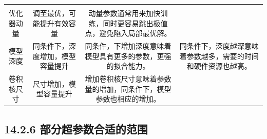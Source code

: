 \begin{longtable}[]{@{}cccc@{}}
\begin{minipage}[t]{0.31\columnwidth}
\end{minipage}\tabularnewline
\begin{minipage}[t]{0.10\columnwidth}\centering\strut
优化器动量\strut
\end{minipage} & \begin{minipage}[t]{0.17\columnwidth}\centering\strut
调至最优，可能提升有效容量\strut
\end{minipage} & \begin{minipage}[t]{0.31\columnwidth}\centering\strut
动量参数通常用来加快训练，同时更容易跳出极值点，避免陷入局部最优解。\strut
\end{minipage} & \begin{minipage}[t]{0.31\columnwidth}\centering\strut
\strut
\end{minipage}\tabularnewline
\begin{minipage}[t]{0.10\columnwidth}\centering\strut
模型深度\strut
\end{minipage} & \begin{minipage}[t]{0.17\columnwidth}\centering\strut
同条件下，深度增加，模型容量提升\strut
\end{minipage} & \begin{minipage}[t]{0.31\columnwidth}\centering\strut
同条件，下增加深度意味着模型具有更多的参数，更强的拟合能力。\strut
\end{minipage} & \begin{minipage}[t]{0.31\columnwidth}\centering\strut
同条件下，深度越深意味着参数越多，需要的时间和硬件资源也越高。\strut
\end{minipage}\tabularnewline
\begin{minipage}[t]{0.10\columnwidth}\centering\strut
卷积核尺寸\strut
\end{minipage} & \begin{minipage}[t]{0.17\columnwidth}\centering\strut
尺寸增加，模型容量提升\strut
\end{minipage} & \begin{minipage}[t]{0.31\columnwidth}\centering\strut
增加卷积核尺寸意味着参数量的增加，同条件下，模型参数也相应的增加。\strut
\end{minipage} & \begin{minipage}[t]{0.31\columnwidth}\centering\strut
\strut
\end{minipage}\tabularnewline
\bottomrule
\end{longtable}

\subsection{14.2.6
部分超参数合适的范围}\label{ux90e8ux5206ux8d85ux53c2ux6570ux5408ux9002ux7684ux8303ux56f4}

